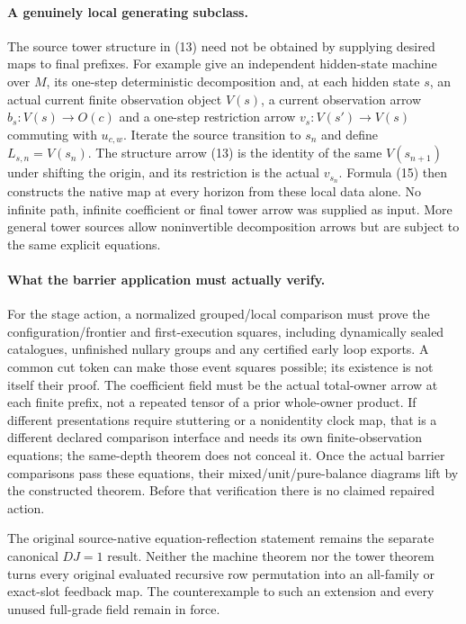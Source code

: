 \documentclass[11pt]{article}
\begin{document}
\paragraph{A genuinely local generating subclass.}
The source tower structure in (13) need not be obtained by supplying desired maps to final prefixes. For example give an independent hidden-state machine over $M$, its one-step deterministic decomposition and, at each hidden state $s$, an actual current finite observation object $V(s)$, a current observation arrow $b_s:V(s)\to O(c)$ and a one-step restriction arrow $v_s:V(s')\to V(s)$ commuting with $u_{c,w}$. Iterate the source transition to $s_n$ and define $L_{s,n}=V(s_n)$. The structure arrow (13) is the identity of the same $V(s_{n+1})$ under shifting the origin, and its restriction is the actual $v_{s_n}$. Formula (15) then constructs the native map at every horizon from these local data alone. No infinite path, infinite coefficient or final tower arrow was supplied as input. More general tower sources allow noninvertible decomposition arrows but are subject to the same explicit equations.

\paragraph{What the barrier application must actually verify.}
For the stage action, a normalized grouped/local comparison must prove the configuration/frontier and first-execution squares, including dynamically sealed catalogues, unfinished nullary groups and any certified early loop exports. A common cut token can make those event squares possible; its existence is not itself their proof. The coefficient field must be the actual total-owner arrow at each finite prefix, not a repeated tensor of a prior whole-owner product. If different presentations require stuttering or a nonidentity clock map, that is a different declared comparison interface and needs its own finite-observation equations; the same-depth theorem does not conceal it. Once the actual barrier comparisons pass these equations, their mixed/unit/pure-balance diagrams lift by the constructed theorem. Before that verification there is no claimed repaired action.

The original source-native equation-reflection statement remains the separate canonical $DJ=1$ result. Neither the machine theorem nor the tower theorem turns every original evaluated recursive row permutation into an all-family or exact-slot feedback map. The counterexample to such an extension and every unused full-grade field remain in force.
\end{document}
